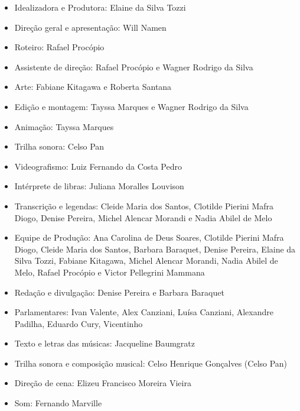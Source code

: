 \begin{itemize}
\item Idealizadora e Produtora: Elaine da Silva Tozzi
\item Direção geral e apresentação: Will Namen
\item Roteiro: Rafael Procópio
\item Assistente de direção: Rafael Procópio e Wagner Rodrigo da Silva
\item Arte: Fabiane Kitagawa e Roberta Santana
\item Edição e montagem: Tayssa Marques e Wagner Rodrigo da Silva
\item Animação: Tayssa Marques
\item Trilha sonora: Celso Pan
\item Videografismo: Luiz Fernando da Costa Pedro
\item Intérprete de libras: Juliana Moralles Louvison
\item Transcrição e legendas: Cleide Maria dos Santos, Clotilde Pierini Mafra Diogo, Denise Pereira, Michel Alencar Morandi e Nadia Abilel de Melo
\item Equipe de Produção: Ana Carolina de Deus Soares, Clotilde Pierini Mafra Diogo, Cleide Maria dos Santos, Barbara Baraquet, Denise Pereira, Elaine da Silva Tozzi, Fabiane Kitagawa, Michel Alencar Morandi, Nadia Abilel de Melo, Rafael Procópio e Victor Pellegrini Mammana
\item Redação e divulgação: Denise Pereira e Barbara Baraquet
\item Parlamentares: Ivan Valente, Alex Canziani, Luísa Canziani, Alexandre Padilha, Eduardo Cury, Vicentinho
\item Texto e letras das músicas: Jacqueline Baumgratz
\item Trilha sonora e composição musical: Celso Henrique Gonçalves (Celso Pan)
\item Direção de cena: Elizeu Francisco Moreira Vieira
\item Som: Fernando Marville





\end{itemize}
